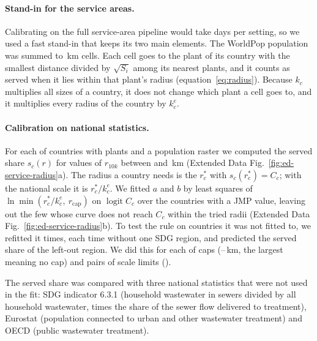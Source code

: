 \paragraph{Stand-in for the service areas.} Calibrating on the full service-area pipeline would take
days per setting, so we used a fast stand-in that keeps its two main elements. The WorldPop population
was summed to \calCellKm\,km cells. Each cell goes to the plant of its country with the smallest
distance divided by $\sqrt{S_i}$ among its \calCandidatePlants{} nearest plants, and it counts as
served when it lies within that plant's radius (equation~\eqref{eq:radius}). Because $k_c$ multiplies
all sizes of a country, it does not change which plant a cell goes to, and it multiplies every radius
of the country by $k_c^{e}$.

\paragraph{Calibration on national statistics.} For each of \calCurveCountries{} countries with plants
and a population raster we computed the served share $s_c(r)$ for \calGridCount{} values of $r_{10k}$
between \calGridStart{} and \calGridStop\,km (Extended Data Fig.~\ref{fig:ed-service-radius}a). The
radius a country needs is the $r^{*}_c$ with $s_c(r^{*}_c)=C_c$; with the national scale it is
$r^{*}_c/k_c^{e}$. We fitted $a$ and $b$ by least squares of $\ln \min(r^{*}_c/k_c^{e},\ r_{\mathrm{cap}})$
on $\operatorname{logit} C_c$ over the \calCountries{} countries with a JMP value, leaving out the few
whose curve does not reach $C_c$ within the tried radii (Extended Data
Fig.~\ref{fig:ed-service-radius}b). To test the rule on countries it was not fitted to, we refitted it
\calRegions{} times, each time without one SDG region, and predicted the served share of the left-out
region.
We did this for each of \calCapCount{} caps (\calCapLow--\calCapHigh\,km, the largest meaning no cap)
and \calLimitCount{} pairs of scale limits (\calLimitList).

The served share was compared with three national statistics that were not used in the fit: SDG
indicator 6.3.1 (household wastewater in sewers divided by all household wastewater, times the share
of the sewer flow delivered to treatment)\cite{sdg631}, Eurostat (population connected to urban and
other wastewater treatment)\cite{eurostat_wwcon} and OECD (public wastewater treatment)\cite{oecd_treat}.

